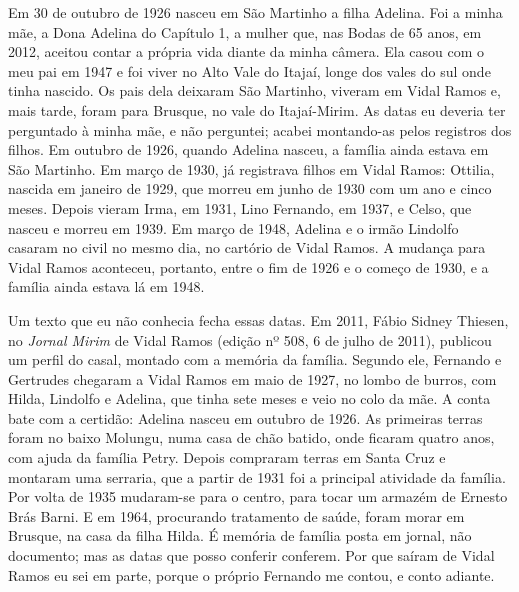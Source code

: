 \documentclass[
  brazilian,
  11pt,
  openany]{book}
\begin{document}
Em 30 de outubro de 1926 nasceu em São Martinho a filha Adelina. Foi a
minha mãe, a Dona Adelina do Capítulo 1, a mulher que, nas Bodas de 65
anos, em 2012, aceitou contar a própria vida diante da minha câmera. Ela
casou com o meu pai em 1947 e foi viver no Alto Vale do Itajaí, longe
dos vales do sul onde tinha nascido. Os pais dela deixaram São Martinho,
viveram em Vidal Ramos e, mais tarde, foram para Brusque, no vale do
Itajaí-Mirim. As datas eu deveria ter perguntado à minha mãe, e não
perguntei; acabei montando-as pelos registros dos filhos. Em outubro de
1926, quando Adelina nasceu, a família ainda estava em São Martinho. Em
março de 1930, já registrava filhos em Vidal Ramos: Ottilia, nascida em
janeiro de 1929, que morreu em junho de 1930 com um ano e cinco meses.
Depois vieram Irma, em 1931, Lino Fernando, em 1937, e Celso, que nasceu
e morreu em 1939. Em março de 1948, Adelina e o irmão Lindolfo casaram
no civil no mesmo dia, no cartório de Vidal Ramos. A mudança para Vidal
Ramos aconteceu, portanto, entre o fim de 1926 e o começo de 1930, e a
família ainda estava lá em 1948.

Um texto que eu não conhecia fecha essas datas. Em 2011, Fábio Sidney
Thiesen, no \emph{Jornal Mirim} de Vidal Ramos (edição nº 508, 6 de
julho de 2011), publicou um perfil do casal, montado com a memória da
família. Segundo ele, Fernando e Gertrudes chegaram a Vidal Ramos em
maio de 1927, no lombo de burros, com Hilda, Lindolfo e Adelina, que
tinha sete meses e veio no colo da mãe. A conta bate com a certidão:
Adelina nasceu em outubro de 1926. As primeiras terras foram no baixo
Molungu, numa casa de chão batido, onde ficaram quatro anos, com ajuda
da família Petry. Depois compraram terras em Santa Cruz e montaram uma
serraria, que a partir de 1931 foi a principal atividade da família. Por
volta de 1935 mudaram-se para o centro, para tocar um armazém de Ernesto
Brás Barni. E em 1964, procurando tratamento de saúde, foram morar em
Brusque, na casa da filha Hilda. É memória de família posta em jornal,
não documento; mas as datas que posso conferir conferem. Por que saíram
de Vidal Ramos eu sei em parte, porque o próprio Fernando me contou, e
conto adiante.
\end{document}
